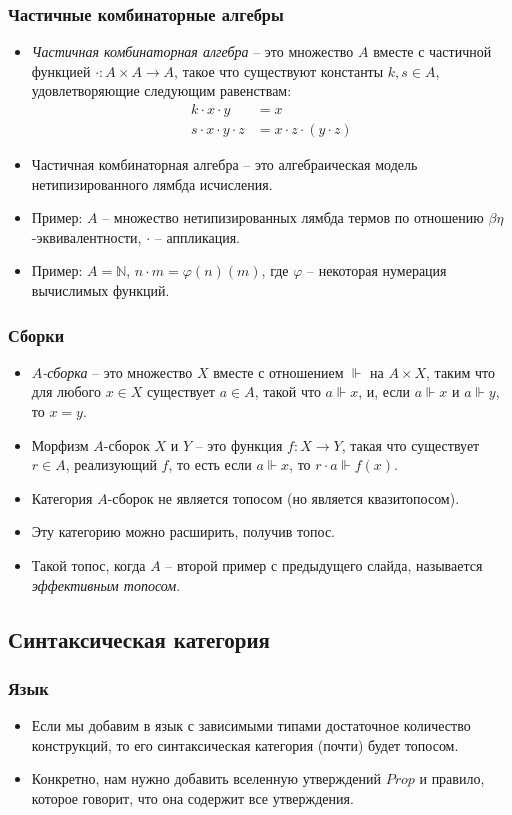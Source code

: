 \documentclass{beamer}
\theoremstyle{definition}
\begin{document}
\begin{frame}
\frametitle{Частичные комбинаторные алгебры}
\begin{itemize}
\item \emph{Частичная комбинаторная алгебра} -- это множество $A$ вместе с частичной функцией $\cdot : A \times A \to A$, такое что существуют константы $k,s \in A$, удовлетворяющие следующим равенствам:
\begin{align*}
k \cdot x \cdot y & = x \\
s \cdot x \cdot y \cdot z & = x \cdot z \cdot (y \cdot z)
\end{align*}
\item Частичная комбинаторная алгебра -- это алгебраическая модель нетипизированного лямбда исчисления.
\item Пример: $A$ -- множество нетипизированных лямбда термов по отношению $\beta \eta$-эквивалентности, $\cdot$ -- аппликация.
\item Пример: $A = \mathbb{N}$, $n \cdot m = \varphi(n)(m)$, где $\varphi$ -- некоторая нумерация вычислимых функций.
\end{itemize}
\end{frame}

\begin{frame}
\frametitle{Сборки}
\begin{itemize}
\item \emph{$A$-сборка} -- это множество $X$ вместе с отношением $\Vdash$ на $A \times X$, таким что для любого $x \in X$ существует $a \in A$, такой что $a \Vdash x$, и, если $a \Vdash x$ и $a \Vdash y$, то $x = y$.
\item Морфизм $A$-сборок $X$ и $Y$ -- это функция $f : X \to Y$, такая что существует $r \in A$, реализующий $f$, то есть если $a \Vdash x$, то $r \cdot a \Vdash f(x)$.
\item Категория $A$-сборок не является топосом (но является квазитопосом).
\item Эту категорию можно расширить, получив топос.
\item Такой топос, когда $A$ -- второй пример с предыдущего слайда, называется \emph{эффективным топосом}.
\end{itemize}
\end{frame}

\subsection{Синтаксическая категория}

\begin{frame}
\frametitle{Язык}
\begin{itemize}
\item Если мы добавим в язык с зависимыми типами достаточное количество конструкций, то его синтаксическая категория (почти) будет топосом.
\item Конкретно, нам нужно добавить вселенную утверждений $Prop$ и правило, которое говорит, что она содержит все утверждения.
\end{itemize}
\end{frame}
\end{document}
